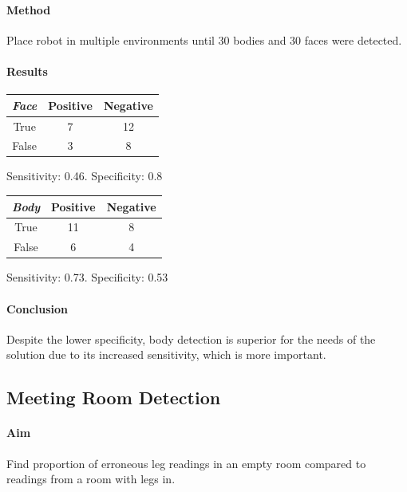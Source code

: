 \paragraph{Method}

Place robot in multiple environments until 30 bodies and 30 faces were detected.

\paragraph{Results}

\begin{center}
\begin{tabular}{ |c|c|c| } 
 \hline
 \textbf{\textit{Face}} & Positive & Negative \\
 \hline
 True & 7 & 12 \\
 False & 3 & 8 \\
 \hline
\end{tabular}
\end{center}

Sensitivity: 0.46. Specificity: 0.8

\begin{center}
\begin{tabular}{ |c|c|c| } 
 \hline
 \textbf{\textit{Body}} & Positive & Negative \\
 \hline
 True & 11 & 8 \\
 False & 6 & 4 \\
 \hline
\end{tabular}
\end{center}

Sensitivity: 0.73. Specificity: 0.53

\paragraph{Conclusion}

Despite the lower specificity, body detection is superior for the needs of the solution due to its increased sensitivity, which is more important.

\subsection{Meeting Room Detection}

\paragraph{Aim}

Find proportion of erroneous leg readings in an empty room compared to readings from a room with legs in.

